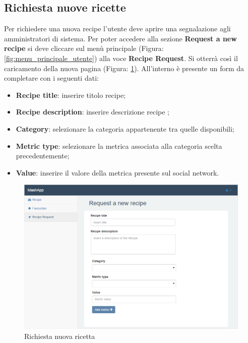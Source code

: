 	\subsection{Richiesta nuove ricette} %
	\label{sec:Richiesta nuove ricette}
		Per richiedere una nuova recipe\gloss{} l'utente deve aprire una segnalazione agli amministratori di sistema.\newline
		Per poter accedere alla sezione \textbf{Request a new recipe} si deve cliccare sul menù principale (Figura: \ref{fig:menu_principale_utente}) alla voce \textbf{Recipe Request}.
		Si otterrà così il caricamento della nuova pagina (Figura: \ref{fig:richiesta_nuova_ricetta}). All'interno è presente un form da completare con i seguenti dati:
		\begin{itemize}
			\item \textbf{Recipe title}: inserire titolo recipe;
			\item \textbf{Recipe description}: inserire descrizione recipe ;
			\item \textbf{Category}: selezionare la categoria appartenente tra quelle disponibili;
			\item \textbf{Metric type}: selezionare la metrica associata alla categoria scelta precedentemente;
			\item \textbf{Value}: inserire il valore della metrica presente sul social network.
		\end{itemize}
		\begin{figure}[H]
			\centering
			\centerline{\includegraphics[width=14cm]{images/richiesta_nuova_ricetta.png}}
			\caption{Richiesta nuova ricetta}
			\label{fig:richiesta_nuova_ricetta}
		\end{figure}



